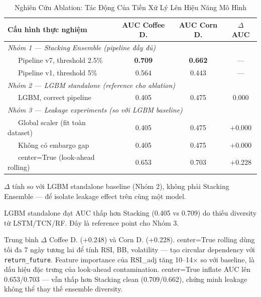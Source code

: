 \begin{table}[htbp]
\caption{Nghiên Cứu Ablation: Tác Động Của Tiền Xử Lý Lên Hiệu Năng Mô Hình}
\label{tab:ablation}
\centering
\begin{threeparttable}
\begin{tabular}{@{}lccc@{}}
\toprule
\textbf{Cấu hình thực nghiệm}
  & \textbf{AUC Coffee D.}
  & \textbf{AUC Corn D.}
  & \textbf{$\Delta$ AUC\tnote{a}} \\
\midrule
\multicolumn{4}{l}{\textit{Nhóm 1 — Stacking Ensemble (pipeline đầy đủ)}} \\
\midrule
~~~Pipeline v7, threshold 2.5\%   & \textbf{0.709} & \textbf{0.662} & — \\
~~~Pipeline v1, threshold 5\%     & 0.564          & 0.443          & — \\
\midrule
\multicolumn{4}{l}{\textit{Nhóm 2 — LGBM standalone (reference cho ablation)\tnote{b}}} \\
\midrule
~~~LGBM, correct pipeline         & 0.405          & 0.475          & 0.000 \\
\midrule
\multicolumn{4}{l}{\textit{Nhóm 3 — Leakage experiments (so với LGBM baseline)}} \\
\midrule
~~~Global scaler (fit toàn dataset)    & 0.405 & 0.475 & $+$0.000 \\
~~~Không có embargo gap                & 0.405 & 0.475 & $+$0.000 \\
~~~center=True (look-ahead rolling)    & 0.653 & 0.703 & $+$0.228\tnote{c} \\
\bottomrule
\end{tabular}
\begin{tablenotes}
\footnotesize
\item[a] $\Delta$ tính so với LGBM standalone baseline (Nhóm 2), không phải
         Stacking Ensemble — để isolate leakage effect trên cùng một model.
\item[b] LGBM standalone đạt AUC thấp hơn Stacking (0.405 vs 0.709) do thiếu
         diversity từ LSTM/TCN/RF. Đây là reference point cho Nhóm 3.
\item[c] Trung bình $\Delta$ Coffee D. (+0.248) và Corn D. (+0.228).
         center=True rolling dùng tối đa 7 ngày tương lai để tính RSI, BB,
         volatility — tạo circular dependency với \texttt{return\_future}.
         Feature importance của RSI\_adj tăng 10--14$\times$ so với baseline,
         là dấu hiệu đặc trưng của look-ahead contamination.
         center=True inflate AUC lên 0.653/0.703 — vẫn thấp hơn Stacking
         clean (0.709/0.662), chứng minh leakage không thể thay thế
         ensemble diversity.
\end{tablenotes}
\end{threeparttable}
\end{table}


